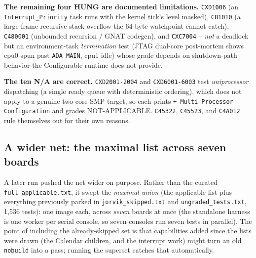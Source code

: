 \textbf{The remaining four HUNG are documented limitations.} \texttt{CXD1006} (an
\texttt{Interrupt\_Priority} task runs with the kernel tick's level masked),
\texttt{CB1010} (a large-frame recursive stack overflow the 64-byte watchpoint cannot
catch), \texttt{C480001} (unbounded recursion / GNAT codegen), and \texttt{CXC7004}
-- \emph{not} a deadlock but an environment-task \emph{termination} test (JTAG dual-core
post-mortem shows cpu0 spun past \texttt{ADA\_MAIN}, cpu1 idle) whose grade depends on
shutdown-path behavior the Configurable runtime does not provide.

\textbf{The ten N/A are correct.} \texttt{CXD2001-2004} and \texttt{CXD6001-6003} test
\emph{uniprocessor} dispatching (a single ready queue with deterministic ordering),
which does not apply to a genuine two-core SMP target, so each prints
\texttt{+ Multi-Processor Configuration} and grades NOT-APPLICABLE. \texttt{C45322},
\texttt{C45523}, and \texttt{C4A012} rule themselves out for their own reasons.

\subsection{A wider net: the maximal list across seven boards}

A later run pushed the net wider on purpose. Rather than the curated
\texttt{full\_applicable.txt}, it swept the \emph{maximal union} (the applicable
list plus everything previously parked in \texttt{jorvik\_skipped.txt} and
\texttt{ungraded\_tests.txt}, 1{,}536 tests): one image each, across \emph{seven}
boards at once (the standalone harness is one worker per serial console, so seven
consoles run seven tests in parallel). The point of including the already-skipped
set is that capabilities added since the lists were drawn (the Calendar children,
and the interrupt work) might turn an old \texttt{nobuild} into a pass; running the
superset catches that automatically.

